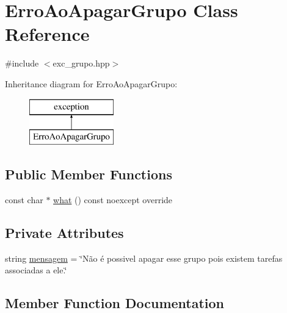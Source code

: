 \hypertarget{classErroAoApagarGrupo}{}\section{Erro\+Ao\+Apagar\+Grupo Class Reference}
\label{classErroAoApagarGrupo}


{\ttfamily \#include $<$exc\+\_\+grupo.\+hpp$>$}

Inheritance diagram for Erro\+Ao\+Apagar\+Grupo\+:\begin{figure}[H]
\begin{center}
\leavevmode
\includegraphics[height=2.000000cm]{classErroAoApagarGrupo}
\end{center}
\end{figure}
\subsection*{Public Member Functions}
\begin{DoxyCompactItemize}
\item 
const char $\ast$ \hyperlink{classErroAoApagarGrupo_a6857dcb5c67b480046e93e00d29c59ef}{what} () const noexcept override
\end{DoxyCompactItemize}
\subsection*{Private Attributes}
\begin{DoxyCompactItemize}
\item 
string \hyperlink{classErroAoApagarGrupo_a9a71b44cefcc19a8f9d4b8f97efa9ac5}{mensagem} = \char`\"{}Não é possivel apagar esse grupo pois existem tarefas associadas a ele.\char`\"{}
\end{DoxyCompactItemize}


\subsection{Member Function Documentation}
\mbox{\label{classErroAoApagarGrupo_a6857dcb5c67b480046e93e00d29c59ef}} 
